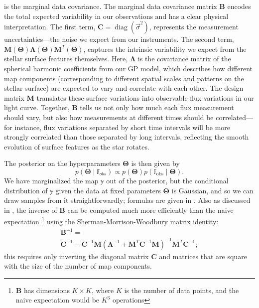 \documentclass[twocolumn]{aastex631}
\newcommand{\sabinasays}[1]{{\color{purple}#1}}
\DeclareMathOperator{\diag}{diag}
\begin{document}
is the marginal data covariance. \sabinasays{The marginal data covariance matrix $\pmb{B}$ encodes the total expected variability in our observations 
and has a clear physical interpretation. The first term, $\pmb{C} = \diag\left({\vec{\sigma}^2}\right)$, 
represents the measurement uncertainties—the noise we expect from our instruments. The second term, 
$\pmb{M}\left(\pmb{\Theta}\right) \pmb{\Lambda}\left(\pmb{\Theta} \right) \pmb{M}^T\left(\pmb{\Theta}\right)$, 
captures the intrinsic variability we expect from the stellar surface features themselves. Here, $\pmb{\Lambda}$ is the 
covariance matrix of the spherical harmonic coefficients from our GP model, which describes how different map components 
(corresponding to different spatial scales and patterns on the stellar surface) are expected to vary and correlate with each 
other. The design matrix $\pmb{M}$ translates these surface variations into observable flux variations in our light curve. 
Together, $\pmb{B}$ tells us not only how much each flux measurement should vary, but also how measurements at different times 
should be correlated—for instance, flux variations separated by short time intervals will be more strongly correlated than 
those separated by long intervals, reflecting the smooth evolution of surface features as the star rotates.}

The posterior on the hyperparameters $\pmb{\Theta}$ is then
given by
\begin{equation}
    p\left(\pmb{\Theta} \mid \mathbb{f}_{obs}\right) \propto p\left(\pmb{\Theta}\right) p\left( \mathbb{f}_\mathrm{obs} \mid \pmb{\Theta} \right). 
\end{equation}
We have marginalized the map $\mathbb{y}$ out of the posterior, but the
conditional distribution of $\mathbb{y}$ given the data at fixed parameters
$\pmb{\Theta}$ is Gaussian, and so we can draw samples from it
straightforwardly; formulas are given in \citet{Hogg2020}.  Also as discussed in
\citet{Hogg2020}, the inverse of $\pmb{B}$ can be computed much more efficiently than the naive expectation%
\footnote{$\pmb{B}$ has dimensions $K \times K$, where $K$ is the number of data points, and the naive expectation would be $K^3$ operations} %
using the Sherman-Morrison-Woodbury matrix identity:
%
\begin{multline}
    \label{eq:Hoggtrick}
    \pmb{B}^{-1} = \\ \pmb{C}^{-1} - \pmb{C}^{-1} \pmb{M} \left( \pmb{\Lambda}^{-1} + \pmb{M}^T \pmb{C}^{-1} \pmb{M} \right)^{-1} \pmb{M}^T \pmb{C}^{-1};
\end{multline}
%
this requires only inverting the diagonal matrix $\pmb{C}$ and matrices that are
square with the size of the number of map components.
\end{document}
